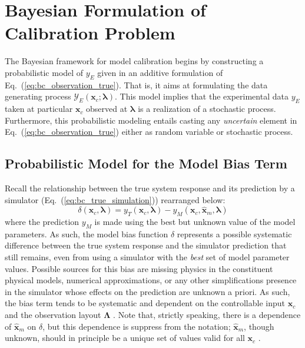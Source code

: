 \section{Bayesian Formulation of Calibration Problem}\label{sec:bc_modular}

The Bayesian framework for model calibration begins by constructing a probabilistic model of $y_E$ given in an additive formulation of Eq.~(\ref{eq:bc_observation_true}). 
That is, it aims at formulating the data generating process $\mathcal{Y}_E(\bm{x}_c; \bm{\lambda})$.
This model implies that the experimental data $y_E$ taken at particular $\bm{x}_c$ observed at $\bm{\lambda}$ is a realization of a stochastic process.
Furthermore, this probabilistic modeling entails casting any \emph{uncertain} element in Eq.~(\ref{eq:bc_observation_true}) either as random variable or stochastic process.

\subsection{Probabilistic Model for the Model Bias Term }\label{sub:bc_modular_bias}

Recall the relationship between the true system response and its prediction by a simulator (Eq.~(\ref{eq:bc_true_simulation})) rearranged below:
\begin{equation*}
    \delta (\bm{x}_c, \boldsymbol{\lambda}) = y_T(\bm{x}_c, \boldsymbol{\lambda}) - y_M (\bm{x}_c, \hat{\bm{x}}_m, \boldsymbol{\lambda})
\end{equation*}
where the prediction $y_M$ is made using the best but unknown value of the model parameters.
As such, the model bias function $\delta$ represents a possible systematic difference between the true system response and the simulator prediction that still remains, even from using a simulator with the \emph{best} set of model parameter values.
Possible sources for this bias are missing physics in the constituent physical models, numerical approximations, or any other simplifications presence in the simulator whose effects on the prediction are unknown a priori.
As such, the bias term tends to be systematic and dependent on the controllable input $\bm{x}_c$ and the observation layout $\boldsymbol{\Lambda}$ \cite{Reichert2012}.
Note that, strictly speaking, there is a dependence of $\hat{\bm{x}}_m$ on $\delta$, but this dependence is suppress from the notation; $\hat{\bm{x}}_m$, though unknown, should in principle be a unique set of values valid for all $\bm{x}_c$ \cite{Bayarri2007,Arendt2012}.

